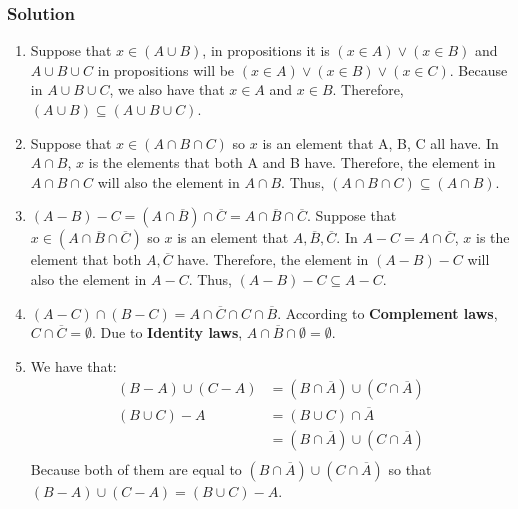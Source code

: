 \documentclass{article}
\theoremstyle{mytheoremstyle}
\theoremstyle{mytheoremstyle}
\theoremstyle{myproblemstyle}
\begin{document}
    \subsubsection*{Solution}
        \begin{enumerate} [label = (\alph*)]
            \item Suppose that \(x \in (A \cup B)\), in propositions it is \((x \in A) \lor (x \in B)\) and \(A \cup B \cup C\) in
            propositions will be \((x \in A) \lor (x \in B) \lor (x \in C)\). Because in \(A \cup B \cup C\), we also have that
            \(x \in A\) and \(x \in B\). Therefore, \((A \cup B) \subseteq (A \cup B \cup C)\).
            \item Suppose that  \(x \in (A \cap B \cap C)\) so \(x\) is an element that A, B, C all have. In \(A \cap B\),
            \(x\) is the elements that both A and B have. Therefore, the element in \(A \cap B \cap C\) will also the element in
            \(A \cap B\). Thus, \((A \cap B \cap C) \subseteq (A \cap B)\).
            \item \((A - B) - C = (A \cap \overline{B}) \cap \overline{C} = A \cap \overline{B} \cap \overline{C}\). Suppose
            that \(x \in (A \cap \overline{B} \cap \overline{C})\) so \(x\) is an element that \(A, \overline{B}, \overline{C}\).
            In \(A - C = A \cap \overline{C}\), \(x\) is the element that both \(A, \overline{C}\) have. Therefore, the element in
            \((A - B) - C\) will also the element in \(A - C\). Thus, \((A - B) - C \subseteq A - C\).
            \item \((A - C) \cap (B - C) = A \cap \overline{C} \cap C \cap \overline{B}\). According to \textbf{Complement laws}, \(C \cap \overline{C} = \emptyset\).
            Due to \textbf{Identity laws}, \(A \cap \overline{B} \cap \emptyset = \emptyset\).
            \item We have that: 
            \begin{align*}
                (B - A) \cup (C - A) &= (B \cap \overline{A}) \cup (C \cap \overline{A})\\
                (B \cup C) - A &= (B \cup C) \cap \overline{A} \\
                                &= (B \cap \overline{A}) \cup (C \cap \overline{A})\\
            \end{align*}
            Because both of them are equal to \((B \cap \overline{A}) \cup (C \cap \overline{A})\) so that 
            \((B - A) \cup (C - A) = (B \cup C) - A\).
        \end{enumerate}
\end{document}

